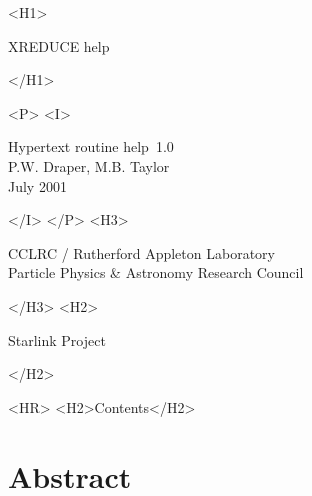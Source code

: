 \documentclass[11pt]{article}
\newcommand{\stardoccategory}  {Hypertext routine help}
\newcommand{\stardocnumber}    {1.0}
\newcommand{\stardocauthors}   {P.W. Draper, M.B. Taylor}
\newcommand{\stardocdate}      {July 2001}
\newcommand{\stardoctitle}     {XREDUCE help}
\newcommand{\htmladdnormallink}[2]{#1}
\newcommand{\htmladdimg}[1]{}
\newcommand{\htmlref}[2]{#1}
\newcommand{\htmladdtonavigation}[1]{}
\newcommand{\xlabel}[1]{}
\begin{document}
\begin{htmlonly}
   \xlabel{}
   \begin{rawhtml} <H1> \end{rawhtml}
      \stardoctitle
   \begin{rawhtml} </H1> \end{rawhtml}


   \begin{rawhtml} <P> <I> \end{rawhtml}
   \stardoccategory\ \stardocnumber \\
   \stardocauthors \\
   \stardocdate
   \begin{rawhtml} </I> </P> <H3> \end{rawhtml}
      \htmladdnormallink{CCLRC}{http://www.cclrc.ac.uk} /
      \htmladdnormallink{Rutherford Appleton Laboratory}
                        {http://www.cclrc.ac.uk/ral} \\
      Particle Physics \& Astronomy Research Council \\
   \begin{rawhtml} </H3> <H2> \end{rawhtml}
      \htmladdnormallink{Starlink Project}{http://www.starlink.ac.uk/}
   \begin{rawhtml} </H2> \end{rawhtml}

  \label{stardoccontents}
  \begin{rawhtml}
    <HR>
    <H2>Contents</H2>
  \end{rawhtml}
  \htmladdtonavigation{\htmlref{\htmladdimg{contents_motif.gif}}
        {stardoccontents}}

  \section{\xlabel{abstract}Abstract}

\end{htmlonly}
\end{document}
